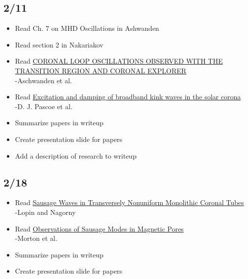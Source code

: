 \documentclass[12pt]{article}
\begin{document}
\subsection*{2/11}
\begin{itemize}
    \item Read Ch. 7 on MHD Oscillations in Ashwanden
    \item Read section 2 in Nakariakov
    \item Read
        \href{http://adsabs.harvard.edu/abs/1999ApJ...520..880A}
        {\textcolor{cobalt}{CORONAL LOOP OSCILLATIONS OBSERVED WITH THE TRANSITION
        REGION AND CORONAL EXPLORER}}\\
        -Aschwanden et al.
    \item Read
        \href{http://cdsads.u-strasbg.fr/abs/2015A\%26A...578A..99P}
        {\textcolor{cobalt}{Excitation and damping of broadband
        kink waves in the solar corona}}\\
        -D. J. Pascoe et al.
    \item Summarize papers in writeup
    \item Create presentation slide for papers
    \item Add a description of research to writeup
\end{itemize}

\subsection*{2/18}
\begin{itemize}
    \item Read
        \href{http://adsabs.harvard.edu/abs/2015ApJ...810...87L}
        {\textcolor{cobalt}{Sausage Waves in Transversely
        Nonuniform Monolithic Coronal Tubes}}\\
        -Lopin and Nagorny
    \item Read
        \href{http://cdsads.u-strasbg.fr/abs/2011ApJ...729L..18M}
        {\textcolor{cobalt}{Observations of Sausage Modes in Magnetic Pores}}\\
        -Morton et al.
    \item Summarize papers in writeup
    \item Create presentation slide for papers
\end{itemize}
\end{document}
